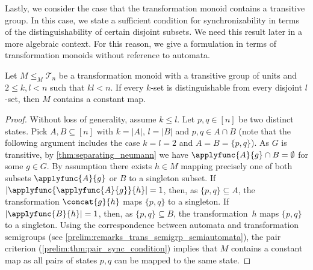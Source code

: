 Lastly, we consider the case that the transformation monoid contains a transitive group. In this case, we state a sufficient condition for synchronizability
in terms of the distinguishability of certain disjoint subsets. We need this result later in a more algebraic context.
For this reason, we give a formulation in terms of transformation monoids without reference to automata.

\begin{proposition} 
	\label{sync_max:prop:disjointklsets}
	Let $M \le_M \mathcal T_n$ be a transformation
	monoid with a transitive group of units
	and $2 \le k, l < n$ such that $kl < n$.
	If every $k$-set is distinguishable
	from every disjoint $l$-set,
	then $M$ contains a constant map. 		
\end{proposition}
\begin{proof}
	Without loss of generality, assume $k \le l$.
	Let $p, q \in [n]$ be two distinct states.
	Pick $A,B \subseteq [n]$ with $k = |A|$, $l = |B|$
	and $p,q \in A \cap B$ (note that the following argument includes the case $k = l = 2$ and $A = B = \{p,q\}$).
	As $G$ is transitive, by \cref{thm:separating_neumann} 
	we have $\applyfunc{A}{g} \cap B = \emptyset$
	for some $g \in G$.
	By assumption there exists $h \in M$
	mapping precisely one of both subsets $\applyfunc{A}{g}$
	or $B$ to a singleton subset.
	If $|\applyfunc{\applyfunc{A}{g}}{h}| = 1$,
	then, as $\{p,q\} \subseteq A$,
	the transformation $\concat{g}{h}$
	maps $\{p,q\}$ to a singleton.
	If $|\applyfunc{B}{h}| = 1$,
	then, as $\{p,q\} \subseteq B$,
	the transformation~$h$ maps $\{p,q\}$
	to a singleton.	
	Using the correspondence between automata
	and transformation semigroups (see \cref{prelim:remarks_trans_semigrp_semiautomata}),
	the pair criterion (\cref{prelim:thm:pair_sync_condition})
	implies that $M$ contains a constant map as all pairs of states $p,q$ 
	can be mapped to the same state.	
\end{proof}